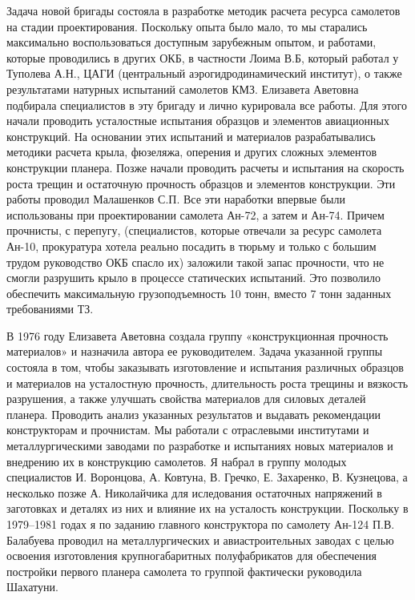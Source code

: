 Задача новой бригады состояла в разработке методик расчета ресурса самолетов на
стадии проектирования. Поскольку опыта было мало, то мы старались максимально
воспользоваться доступным зарубежным опытом, и работами, которые проводились в
других ОКБ, в частности Лоима В.Б, который работал у Туполева А.Н., ЦАГИ
(центральный аэрогидродинамический институт), о также результатами натурных
испытаний самолетов КМЗ. Елизавета Аветовна подбирала специалистов в эту
бригаду и лично курировала все работы. Для этого начали проводить усталостные
испытания образцов и элементов авиационных конструкций. На основании этих
испытаний и материалов разрабатывались методики расчета крыла, фюзеляжа,
оперения и других сложных элементов конструкции планера. Позже начали проводить
расчеты и испытания на скорость роста трещин и остаточную прочность образцов и
элементов конструкции. Эти работы проводил Малашенков С.П. Все эти наработки
впервые были использованы при проектировании самолета Ан-72, а затем и Ан-74.
Причем прочнисты, с перепугу, (специалистов, которые отвечали за ресурс
самолета Ан-10, прокуратура хотела реально посадить в тюрьму и только с большим
трудом руководство ОКБ спасло их) заложили такой запас прочности, что не смогли
разрушить крыло в процессе статических испытаний. Это позволило обеспечить
максимальную грузоподъемность 10 тонн, вместо 7 тонн заданных требованиями ТЗ.

В 1976 году Елизавета Аветовна создала группу «конструкционная прочность
материалов» и назначила автора ее руководителем. Задача указанной группы
состояла в том, чтобы заказывать изготовление и испытания различных образцов и
материалов на усталостную прочность, длительность роста трещины и вязкость
разрушения, а также улучшать свойства материалов для силовых деталей планера.
Проводить анализ указанных результатов и выдавать рекомендации конструкторам и
прочнистам. Мы работали с отраслевыми институтами и металлургическими заводами
по разработке и испытаниях новых материалов и внедрению их в конструкцию
самолетов. Я набрал в группу молодых специалистов И. Воронцова, А. Ковтуна, В.
Гречко, Е. Захаренко, В. Кузнецова, а несколько позже А. Николайчика для
иследования остаточных напряжений в заготовках и деталях из них и влияние их на
усталость конструкции. Поскольку в 1979–1981 годах я по заданию главного
конструктора по самолету Ан-124 П.В. Балабуева проводил на металлургических и
авиастроительных заводах с целью освоения изготовления крупногабаритных
полуфабрикатов для обеспечения постройки первого планера самолета то группой
фактически руководила Шахатуни.

